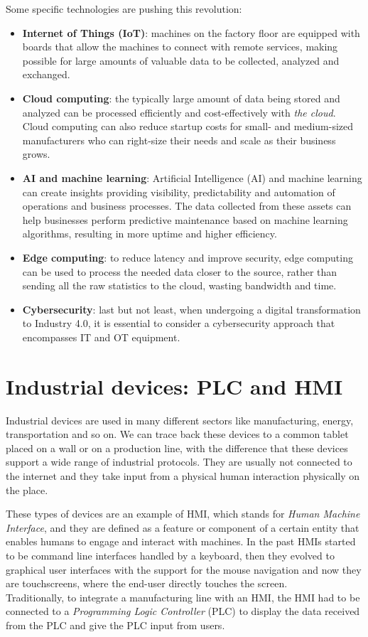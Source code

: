 Some specific technologies are pushing this revolution:~\cite{what-is-industry-4-0}
\begin{itemize}
  \item \textbf{Internet of Things (IoT)}: machines on the factory floor are equipped with boards that allow the machines to connect with remote services, making possible for large amounts of valuable data to be collected, analyzed and exchanged.
  \item \textbf{Cloud computing}: the typically large amount of data being stored and analyzed can be processed efficiently and cost-effectively with \textit{the cloud}. Cloud computing can also reduce startup costs for small- and medium-sized manufacturers who can right-size their needs and scale as their business grows.
  \item \textbf{AI and machine learning}: Artificial Intelligence (AI) and machine learning can create insights providing visibility, predictability and automation of operations and business processes. The data collected from these assets can help businesses perform predictive maintenance based on machine learning algorithms, resulting in more uptime and higher efficiency.
  \item \textbf{Edge computing}: to reduce latency and improve security, edge computing can be used to process the needed data closer to the source, rather than sending all the raw statistics to the cloud, wasting bandwidth and time.
  \item \textbf{Cybersecurity}: last but not least, when undergoing a digital transformation to Industry 4.0, it is essential to consider a cybersecurity approach that encompasses IT and OT equipment.
\end{itemize}

\section{Industrial devices: PLC and HMI}

Industrial devices are used in many different sectors like manufacturing, energy, transportation and so on. We can trace back these devices to a common tablet placed on a wall or on a production line, with the difference that these devices support a wide range of industrial protocols. They are usually not connected to the internet and they take input from a physical human interaction physically on the place.

These types of devices are an example of HMI, which stands for \textit{Human Machine Interface}, and they are defined as a feature or component of a certain entity that enables humans to engage and interact with machines. In the past HMIs started to be command line interfaces handled by a keyboard, then they evolved to graphical user interfaces with the support for the mouse navigation and now they are touchscreens, where the end-user directly touches the screen.\\
Traditionally, to integrate a manufacturing line with an HMI, the HMI had to be connected to a \textit{Programming Logic Controller} (PLC) to display the data received from the PLC and give the PLC input from users.~\cite{what-is-hmi}

